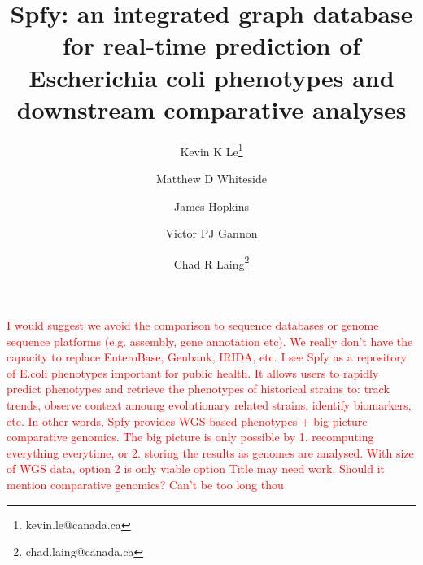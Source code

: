 \documentclass{article}
\newcommand\mwcomment[1]{\textcolor{red}{#1}}
\begin{document}
\mwcomment{I would suggest we avoid the comparison to sequence databases or genome sequence platforms (e.g. assembly, gene annotation etc). We really don't have the capacity to replace EnteroBase, Genbank, IRIDA, etc. I see Spfy as a repository of E.coli phenotypes important for public health. It allows users to rapidly predict phenotypes and retrieve the phenotypes of historical strains to: track trends, observe context amoung evolutionary related strains, identify biomarkers, etc. In other words, Spfy provides WGS-based phenotypes + big picture comparative genomics. The big picture is only possible by 1. recomputing everything everytime, or 2. storing the results as genomes are analysed. With size of WGS data, option 2 is only viable option}
\mwcomment{Title may need work. Should it mention comparative genomics? Can't be too long thou}
\title{Spfy: an integrated graph database for real-time prediction of Escherichia coli phenotypes and downstream comparative analyses}

\author[1]{Kevin K Le\thanks{kevin.le@canada.ca}}
\author[1]{Matthew D Whiteside}
\author[1]{James Hopkins}
\author[1]{Victor PJ Gannon}
\author[1]{Chad R Laing\thanks{chad.laing@canada.ca}}

\renewcommand\Authands{ and }

\maketitle
\end{document}
